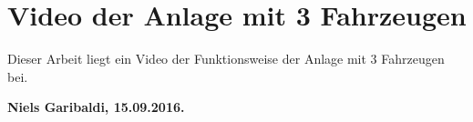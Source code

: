 \section{Video der Anlage mit 3 Fahrzeugen}
	Dieser Arbeit liegt ein Video der Funktionsweise der Anlage mit 3 Fahrzeugen bei.
	
	\clearpage
	
	
		
	\clearpage
	\listoffigures
	
	\clearpage
	\listoftables
	\clearpage
	\thispagestyle{empty}
	\vspace{15cm}
	\centering
	\textbf{Niels Garibaldi, 15.09.2016.}
	\clearpage
	